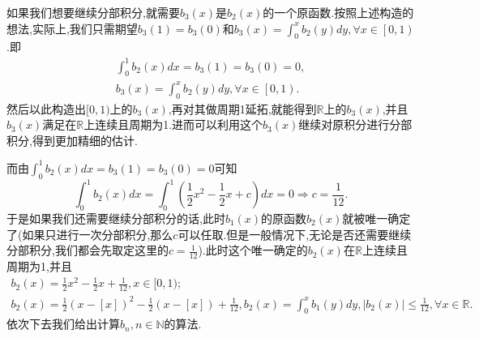 \documentclass[lang=cn,newtx,10pt,scheme=chinese]{elegantbook}
\begin{document}
\begin{remark}
如果我们想要继续分部积分,就需要$b_3(x)$是$b_2(x)$的一个原函数.按照上述构造的想法,实际上,我们只需期望\(b_3(1)=b_3(0)\)和$b_3(x)=\int_0^x{b_2\left( y \right) dy},\forall x\in \left[ 0,1 \right) $.即
\begin{gather*}
   \int_{0}^{1}b_2(x)dx =b_3(1)=b_3(0)= 0,
   \\
   b_3(x)=\int_0^x{b_2\left( y \right) dy},\forall x\in \left[ 0,1 \right).
\end{gather*}
然后以此构造出$[0,1)$上的$b_3(x)$,再对其做周期1延拓,就能得到$\mathbb{R}$上的$b_3(x)$,并且$b_3(x)$满足在$\mathbb{R}$上连续且周期为1.进而可以利用这个$b_3(x)$继续对原积分进行分部积分,得到更加精细的估计.

而由\(\int_{0}^{1}b_2(x)dx =b_3(1)=b_3(0)= 0\)可知
\[
\int_{0}^{1}b_2(x)dx=\int_{0}^{1}\left(\frac{1}{2}x^2-\frac{1}{2}x + c\right)dx = 0\Rightarrow c=\frac{1}{12}.
\]
于是如果我们还需要继续分部积分的话,此时$b_1(x)$的原函数\(b_2(x)\)就被唯一确定了(如果只进行一次分部积分,那么$c$可以任取.但是一般情况下,无论是否还需要继续分部积分,我们都会先取定这里的$c=\frac{1}{12}$).此时这个唯一确定的$b_2(x)$在$\mathbb{R}$上连续且周期为1,\hypertarget{b2性质}{并且}
\begin{gather*}
   b_2(x)=\frac{1}{2}x^2-\frac{1}{2}x + \frac{1}{12},x\in[0,1);
   \\
   b_2(x)=\frac{1}{2}\left( x-\left[ x \right] \right) ^2-\frac{1}{2}\left( x-\left[ x \right] \right) +\frac{1}{12},b_2\left( x \right) =\int_0^x{b_1\left( y \right) dy},\left| b_2\left( x \right) \right|\leqslant \frac{1}{12},\forall x\in \mathbb{R}.
\end{gather*}
依次下去我们给出计算\(b_n,n\in\mathbb{N}\)的算法.
\end{remark}
\end{document}
